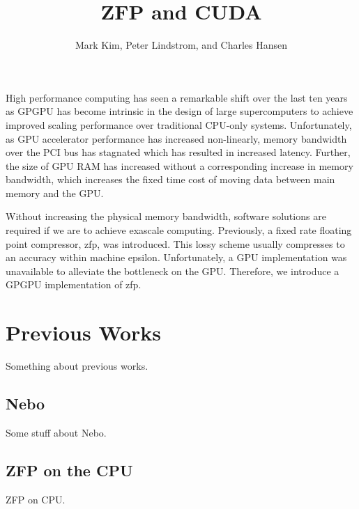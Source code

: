\documentclass[journal]{vgtc}                %
\title{ZFP and CUDA}
\author{Mark Kim, Peter Lindstrom, and Charles Hansen}
\begin{document}


\maketitle


High performance computing has seen a remarkable shift over the
last ten years as GPGPU has become intrinsic in the design of large supercomputers to achieve improved scaling performance over traditional CPU-only systems. Unfortunately, as GPU accelerator performance has increased non-linearly, memory bandwidth over the PCI bus has stagnated which has resulted in increased latency. Further, the size of GPU RAM has increased without a corresponding increase in memory bandwidth, which increases the fixed time cost of moving data between main memory and the GPU.

Without increasing the physical memory bandwidth, software solutions are required if we are to achieve exascale computing. Previously, a fixed rate floating point compressor, zfp, was introduced. This lossy scheme usually compresses to an accuracy within machine epsilon. Unfortunately, a GPU implementation was unavailable to alleviate the bottleneck on the GPU. Therefore, we introduce a GPGPU implementation of zfp.

\section{Previous Works}
Something about previous works.
\subsection{Nebo}
Some stuff about Nebo.

\subsection{ZFP on the CPU}
ZFP on CPU.
\end{document}
